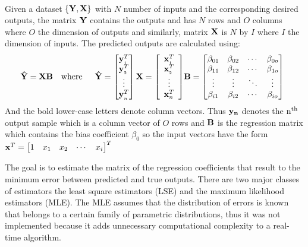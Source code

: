 \documentclass[msc,ai,logo]{infthesis}
\begin{document}
\

Given a dataset $\left\{ {{\bf{Y}},{\bf{X}}} \right\}$ with $N$ number of inputs and the corresponding desired outputs, the matrix $\bf{Y}$ contains the outputs and has $N$ rows and $O$ columns where $O$ the dimension of outputs and similarly, matrix $\bf{X}$ is $N$ by $I$ where  $I$ the dimension of inputs. The predicted outputs are calculated using:
\begin{equation}
\begin{array}{*{20}{c}}
{{\bf{\hat Y = X}}{{\bf{B}}}}&{{\rm{where}}}&{\begin{array}{*{20}{c}}
{{\bf{\hat{Y}}} = 
\begin{bmatrix}
{{\bf{y}}_{_1}^T} \\
{{\bf{y}}_{_2}^T} \\
 \vdots \\
{{\bf{y}}_{_n}^T}
\end{bmatrix}

\bf{X} = \left[ {\begin{array}{*{20}{c}}
{{\bf{x}}_{_1}^T}\\
{{\bf{x}}_{_2}^T}\\
 \vdots \\
{{\bf{x}}_n^T}
\end{array}} \right]}
\bf{B} = 
\begin{bmatrix}
\beta _{01} & \beta _{02}  & \cdots & \beta _{0o} \\
\beta _{11} & \beta _{12}  & \cdots & \beta _{1o} \\
\vdots & \vdots  & \ddots & \vdots \\
\beta _{i1} & \beta _{i2}  & \cdots & \beta _{io} 
\end{bmatrix}
\end{array}}
\end{array}
\end{equation}  
And the bold lower-case letters denote column vectors. Thus $\bf{y_n}$ denotes the ${{\rm{n}}^{{\rm{th}}}}$ output sample which is a column vector of $O$ rows and $\bf{B}$ is the regression matrix which contains the bias coefficient $\beta_0$ so the input vectors have the form ${{{\bf{x}}^T} = \begin{bmatrix}
1 & {{x_1}} & {{x_2}} & \cdots & {{x_i}}
\end{bmatrix}^T}$

The goal is to estimate the matrix of the regression coefficients that result to the minimum error between predicted and true outputs. There are two major classes of estimators the least square estimators (LSE) and the maximum likelihood estimators (MLE). The MLE assumes that the distribution of errors is known that belongs to a certain family of parametric distributions, thus it was not implemented because it adds unnecessary computational complexity to a real-time algorithm.
\end{document}
